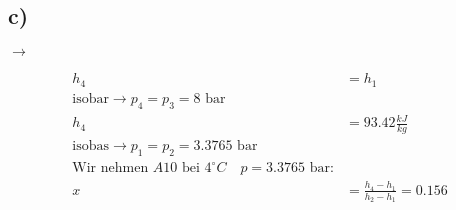 

\subsection*{c)}

 \(\rightarrow\) 

\begin{align*}
h_4 &= h_1 \\
\text{isobar} \rightarrow p_4 = p_3 = 8 \text{ bar} \\
h_4 &= 93.42 \frac{kJ}{kg} \\
\text{isobas} \rightarrow p_1 = p_2 = 3.3765 \text{ bar} \\
\text{Wir nehmen } A10 \text{ bei } 4^\circ C \quad p = 3.3765 \text{ bar:} \\
x &= \frac{h_4 - h_1}{h_2 - h_1} = 0.156
\end{align*}